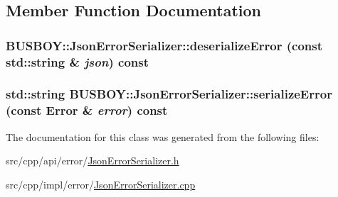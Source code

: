 \subsection{Member Function Documentation}
\hypertarget{classBUSBOY_1_1JsonErrorSerializer_a693580f21972b231e31b704798b3d422}{
\subsubsection[{deserializeError}]{ BUSBOY::JsonErrorSerializer::deserializeError (const std::string \& {\em json}) const}}
\label{classBUSBOY_1_1JsonErrorSerializer_a693580f21972b231e31b704798b3d422}
\hypertarget{classBUSBOY_1_1JsonErrorSerializer_a31b0c1fe7441228253449313c9c20df0}{
\subsubsection[{serializeError}]{\setlength{\rightskip}{0pt plus 5cm}std::string BUSBOY::JsonErrorSerializer::serializeError (const {\bf Error} \& {\em error}) const}}
\label{classBUSBOY_1_1JsonErrorSerializer_a31b0c1fe7441228253449313c9c20df0}


The documentation for this class was generated from the following files:\begin{DoxyCompactItemize}
\item 
src/cpp/api/error/\hyperlink{JsonErrorSerializer_8h}{JsonErrorSerializer.h}\item 
src/cpp/impl/error/\hyperlink{JsonErrorSerializer_8cpp}{JsonErrorSerializer.cpp}\end{DoxyCompactItemize}
